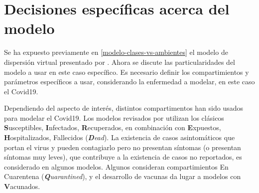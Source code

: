 \section{Decisiones específicas acerca del modelo} \label{met:decisiones}














Se ha expuesto previamente en \ref{modelo-clases-vs-ambientes} el modelo de dispersión virtual presentado por \cite{Bichara2015}. Ahora se discute las particularidades del modelo a usar en este caso específico. Es necesario definir los compartimientos y parámetros específicos a usar, considerando la enfermedad a modelar, en este caso el Covid19.


Dependiendo del aspecto de interés, distintos compartimentos han sido usados para modelar el Covid19. Los modelos revisados por \cite{Xiang2021} utilizan los clásicos \textbf{S}usceptibles, \textbf{I}nfectados, \textbf{R}ecuperados, en combinación con \textbf{E}xpuestos, \textbf{H}ospitalizados, Fallecidos (\textit{\textbf{D}ead}). La existencia de casos asintomáticos que portan el virus y pueden contagiarlo pero no presentan síntomas (o presentan síntomas muy leves), que contribuye a la existencia de casos no reportados, es considerado en algunos modelos. Algunos consideran compartimientos En Cuarentena (\textit{\textbf{Q}uarantined}), y el desarrollo de vacunas da lugar a modelos con \textbf{V}acunados.

